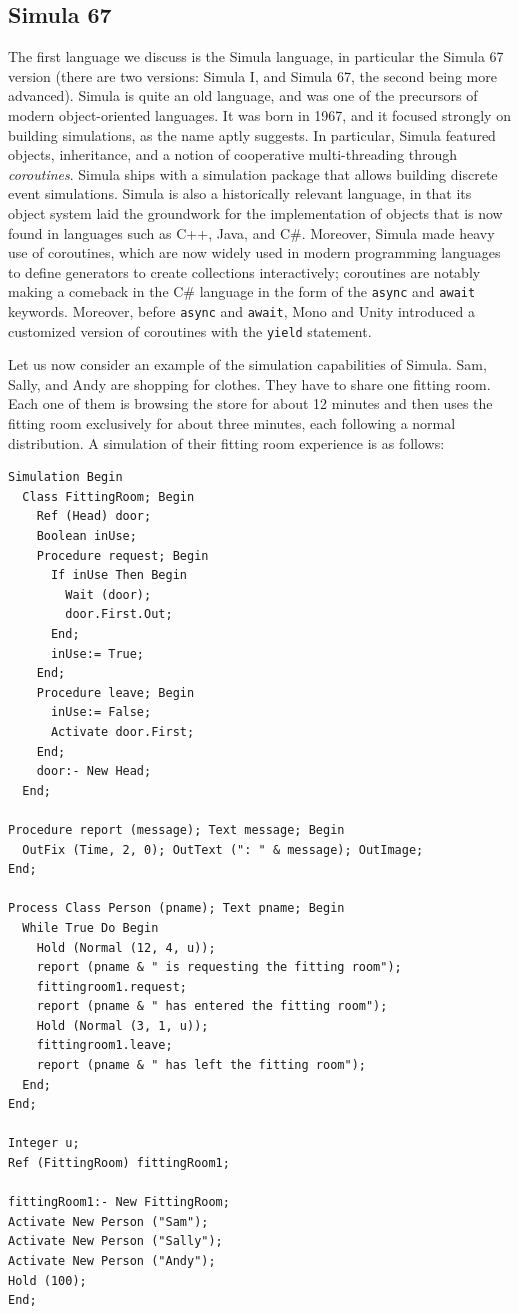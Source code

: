 \subsection{Simula 67}
The first language we discuss is the Simula language, in particular the Simula 67 version (there are two versions: Simula I, and Simula 67, the second being more advanced). Simula is quite an old language, and was one of the precursors of modern object-oriented languages. It was born in 1967, and it focused strongly on building simulations, as the name aptly suggests. In particular, Simula featured objects, inheritance, and a notion of cooperative multi-threading through \textit{coroutines}. Simula ships with a simulation package that allows building discrete event simulations. Simula is also a historically relevant language, in that its object system laid the groundwork for the implementation of objects that is now found in languages such as C++, Java, and C\#. Moreover, Simula made heavy use of coroutines, which are now widely used in modern programming languages to define generators to create collections interactively; coroutines are notably making a comeback in the C\# language in the form of the \texttt{async} and \texttt{await} keywords. Moreover, before \texttt{async} and \texttt{await}, Mono and Unity introduced a customized version of coroutines with the \texttt{yield} statement.

Let us now consider an example of the simulation capabilities of Simula. Sam, Sally, and Andy are shopping for clothes. They have to share one fitting room. Each one of them is browsing the store for about 12 minutes and then uses the fitting room exclusively for about three minutes, each following a normal distribution. A simulation of their fitting room experience is as follows:

\begin{lstlisting}
Simulation Begin 
  Class FittingRoom; Begin 
    Ref (Head) door; 
    Boolean inUse; 
    Procedure request; Begin 
      If inUse Then Begin 
        Wait (door); 
        door.First.Out; 
      End; 
      inUse:= True; 
    End; 
    Procedure leave; Begin 
      inUse:= False; 
      Activate door.First; 
    End; 
    door:- New Head; 
  End;

Procedure report (message); Text message; Begin 
  OutFix (Time, 2, 0); OutText (": " & message); OutImage; 
End;

Process Class Person (pname); Text pname; Begin 
  While True Do Begin 
    Hold (Normal (12, 4, u)); 
    report (pname & " is requesting the fitting room"); 
    fittingroom1.request; 
    report (pname & " has entered the fitting room"); 
    Hold (Normal (3, 1, u)); 
    fittingroom1.leave; 
    report (pname & " has left the fitting room"); 
  End; 
End;

Integer u; 
Ref (FittingRoom) fittingRoom1;

fittingRoom1:- New FittingRoom; 
Activate New Person ("Sam"); 
Activate New Person ("Sally"); 
Activate New Person ("Andy"); 
Hold (100); 
End;
\end{lstlisting}

